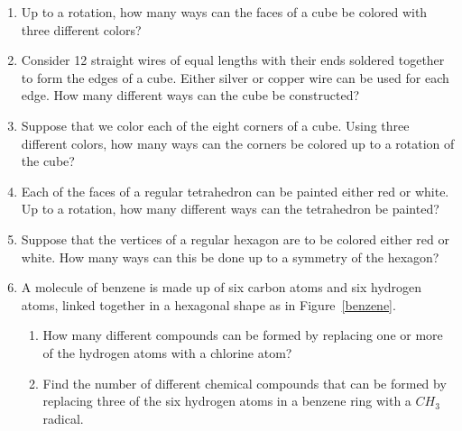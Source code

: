 {\begin{enumerate}
\item
Up to a rotation, how many ways can the faces of a cube be colored
with three different colors? 
 
 
 
\item
Consider 12 straight wires of equal lengths with their ends soldered
together to form the edges of a cube. Either silver or copper wire can be
used for each edge.  How many different ways can the cube be
constructed? 
 
 
 
\item
Suppose that we color each of the eight corners of a cube. Using three
different colors, how many ways can the corners be colored up to a
rotation of the cube? 
 
 
\item
Each of the faces of a regular tetrahedron can be painted either red
or white.  Up to a rotation, how many different ways can the
tetrahedron be painted? 
 
 
\item
Suppose that the vertices of a regular hexagon are to be colored either
red or white.  How many ways can this be done up to a symmetry  of the
hexagon? 
 
 
\item
A molecule of benzene is made up of six carbon atoms and six hydrogen
atoms, linked together in a hexagonal shape as in Figure~\ref{benzene}.
\begin{enumerate}
 
 \item
How many different compounds can be formed by replacing one or more of
the hydrogen atoms with a chlorine atom? 
 
 \item
Find the number of different chemical compounds that can be formed by
replacing three of the six hydrogen atoms in a benzene ring with a
$CH_3$ radical.
 
\end{enumerate}
 
 
\begin{figure}[h]

\begin{center}
\end{center}
\end{figure}
\end{enumerate}}
